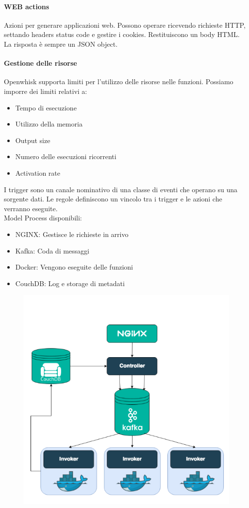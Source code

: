 \documentclass{article}
\begin{document}
		\paragraph{WEB actions}
		Azioni per generare applicazioni web. Possono operare ricevendo richieste HTTP, settando headers status code e gestire i cookies. Restituiscono un body HTML. La risposta è sempre un JSON object.
		\paragraph{Gestione delle risorse}
		Openwhisk supporta limiti per l'utilizzo delle risorse nelle funzioni. Possiamo imporre dei limiti relativi a:
		\begin{itemize}
		    \item Tempo di esecuzione
		    \item Utilizzo della memoria
		    \item Output size
		    \item Numero delle esecuzioni ricorrenti
		    \item Activation rate
		\end{itemize}
		I trigger sono un canale nominativo di una classe di eventi che operano su una sorgente dati. Le regole definiscono un vincolo tra i trigger e le azioni che verranno eseguite.\\
		Model Process disponibili:
		\begin{itemize}
		    \item NGINX: Gestisce le richieste in arrivo
		    \item Kafka: Coda di messaggi
		    \item Docker: Vengono eseguite delle funzioni
		    \item CouchDB: Log e storage di metadati
		\end{itemize}
		
		\begin{figure}[ht]
		\centering
		\includegraphics[width=0.5\linewidth]{SAC_B4_openwhisk}
		\label{fig:sacb4openwhisk}
		\end{figure}
		
\end{document}
